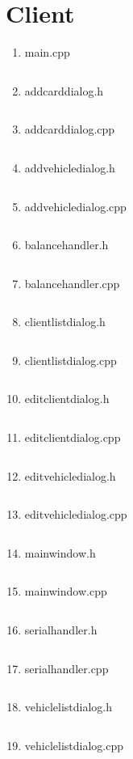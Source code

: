 \documentclass[a4paper, 12pt]{report}
\begin{document}
\newpage
\section{Client}
\begin{enumerate}[left=0pt]
    \item main.cpp
    \inputminted{c++}{../SAPEIClient/main.cpp}
    \newpage
    \item addcarddialog.h
    \inputminted{c++}{../SAPEIClient/addcarddialog.h}
    \item addcarddialog.cpp
    \inputminted{c++}{../SAPEIClient/addcarddialog.cpp}
    \newpage
    \item addvehicledialog.h
    \inputminted{c++}{../SAPEIClient/addvehicledialog.h}
    \item addvehicledialog.cpp
    \inputminted{c++}{../SAPEIClient/addvehicledialog.cpp}
    \newpage
    \item balancehandler.h
    \inputminted{c++}{../SAPEIClient/balancehandler.h}
    \item balancehandler.cpp
    \inputminted{c++}{../SAPEIClient/balancehandler.cpp}
    \newpage
    \item clientlistdialog.h
    \inputminted{c++}{../SAPEIClient/clientlistdialog.h}
    \item clientlistdialog.cpp
    \inputminted{c++}{../SAPEIClient/clientlistdialog.cpp}
    \newpage
    \item editclientdialog.h
    \inputminted{c++}{../SAPEIClient/editclientdialog.h}
    \item editclientdialog.cpp
    \inputminted{c++}{../SAPEIClient/editclientdialog.cpp}
    \newpage
    \item editvehicledialog.h
    \inputminted{c++}{../SAPEIClient/editvehicledialog.h}
    \item editvehicledialog.cpp
    \inputminted{c++}{../SAPEIClient/editvehicledialog.cpp}
    \newpage
    \item mainwindow.h
    \inputminted{c++}{../SAPEIClient/mainwindow.h}
    \item mainwindow.cpp
    \inputminted{c++}{../SAPEIClient/mainwindow.cpp}
    \newpage
    \item serialhandler.h
    \inputminted{c++}{../SAPEIClient/serialhandler.h}
    \item serialhandler.cpp
    \inputminted{c++}{../SAPEIClient/serialhandler.cpp}
    \newpage
    \item vehiclelistdialog.h
    \inputminted{c++}{../SAPEIClient/vehiclelistdialog.h}
    \item vehiclelistdialog.cpp
    \inputminted{c++}{../SAPEIClient/vehiclelistdialog.cpp}
\end{enumerate}
\end{document}
